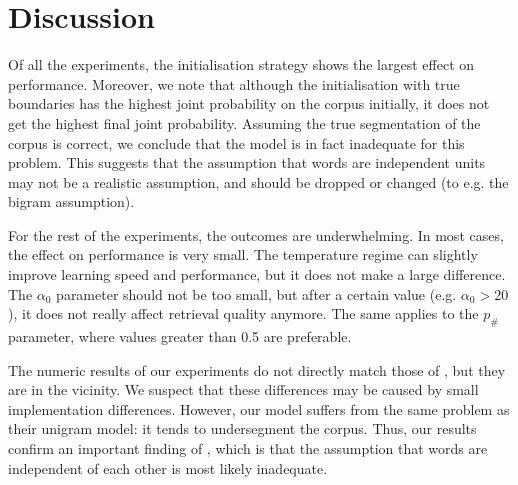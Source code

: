 \section{Discussion}

Of all the experiments, the initialisation strategy shows the largest effect on performance. Moreover, we note that although the initialisation with true boundaries has the highest joint probability on the corpus initially, it does not get the highest final joint probability. Assuming the true segmentation of the corpus is correct, we conclude that the model is in fact inadequate for this problem. This suggests that the assumption that words are independent units may not be a realistic assumption, and should be dropped or changed (to e.g. the bigram assumption).

For the rest of the experiments, the outcomes are underwhelming. In most cases, the effect on performance is very small. The temperature regime can slightly improve learning speed and performance, but it does not make a large difference. The $\alpha_0$ parameter should not be too small, but after a certain value (e.g. $\alpha_0 > 20$), it does not really affect retrieval quality anymore. The same applies to the $p_\#$ parameter, where values greater than 0.5 are preferable.

The numeric results of our experiments do not directly match those of \cite{Goldwater200921}, but they are in the vicinity. We suspect that these differences may be caused by small implementation differences. However, our model suffers from the same problem as their unigram model: it tends to undersegment the corpus. Thus, our results confirm an important finding of \cite{Goldwater200921}, which is that the assumption that words are independent of each other is most likely inadequate.

